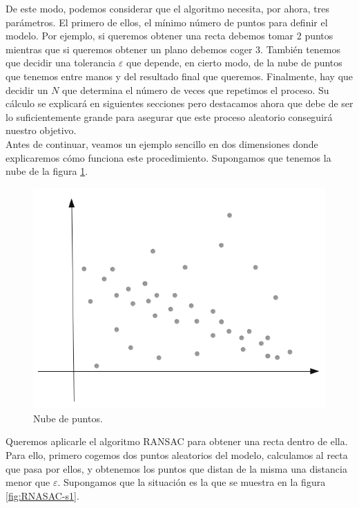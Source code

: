 De este modo, podemos considerar que el algoritmo necesita, por ahora, tres parámetros. El primero de ellos, el mínimo número de puntos para definir el modelo. Por ejemplo, si queremos obtener una recta debemos tomar 2 puntos mientras que si queremos obtener un plano debemos coger 3. También tenemos que decidir una tolerancia $ \varepsilon $ que depende, en cierto modo, de la nube de puntos que tenemos entre manos y del resultado final que queremos. Finalmente, hay que decidir un $ N $ que determina el número de veces que repetimos el proceso. Su cálculo se explicará en siguientes secciones pero destacamos ahora que debe de ser lo suficientemente grande para asegurar que este proceso aleatorio conseguirá nuestro objetivo. \\

Antes de continuar, veamos un ejemplo sencillo en dos dimensiones donde explicaremos cómo funciona este procedimiento. Supongamos que tenemos la nube de la figura \ref{fig:ejransac0}. \\

\begin{figure}[h!]
	\centering
	\includegraphics[width=0.5\linewidth]{imagenes/Ej-RANSAC/ejRANSAC_0}
	\caption{Nube de puntos.}
	\label{fig:ejransac0}
\end{figure}

Queremos aplicarle el algoritmo RANSAC para obtener una recta dentro de ella. Para ello, primero cogemos dos puntos aleatorios del modelo, calculamos al recta que pasa por ellos, y obtenemos los puntos que distan de la misma una distancia menor que $ \varepsilon $. Supongamos que la situación es la que se muestra en la figura \ref{fig:RNASAC-s1}. \\

